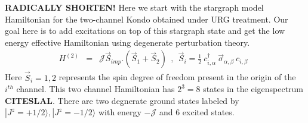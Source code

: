 \documentclass[reprint,prb,superscriptaddress]{revtex4-1}
\begin{document}
\label{sec:eff_ham_2ch}
\textbf{RADICALLY SHORTEN!}
\noindent Here we start with the stargraph model Hamiltonian for the two-channel Kondo obtained under URG treatment. Our goal here is to add excitations on top of this stargraph state and get the low energy effective Hamiltonian using degenerate perturbation theory.
\begin{eqnarray}
H^{(2)}&=& {\mathcal{J}} \vec{S}_{imp}.(\vec{S}_1+\vec{S}_2)~~,~~\vec{S}_i =  \frac{1}{2}~ c_{i,\alpha}^{\dagger}~ \vec{\sigma}_{\alpha,\beta}~ c_{i,\beta}~~
\label{eq:channel-2-spin}
\end{eqnarray}
Here $\vec{S}_i=1,2$ represents the spin degree of freedom present in the origin of the $i^{th}$ channel. This two channel Hamiltonian has $2^3=8$ states in the eigenspectrum \textbf{CITE{SLAL}}. There are two degnerate ground states labeled by $|J^z=+1/2\rangle, |J^z=-1/2\rangle$ with energy $-\mathcal{J}$ and $6$ excited states.
\end{document}
